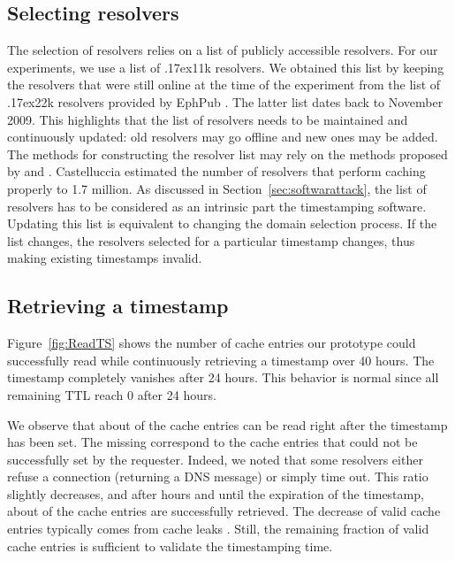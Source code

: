 \subsection{Selecting resolvers}
\label{sec:selectDNSres}
The selection of resolvers relies on a list of publicly accessible resolvers.
For our experiments, we use a list of {\raise.17ex\hbox{}}11k resolvers.
We obtained this list by keeping the resolvers that were still online at the time of the experiment from the list of {\raise.17ex\hbox{}}22k resolvers provided by EphPub \cite{Castelluccia2011}.
The latter list dates back to November 2009.
This highlights that the list of resolvers needs to be maintained and continuously updated: old resolvers may go offline and new ones may be added.
The methods for constructing the resolver list may rely on the methods proposed by \cite{Dagon2008} and \cite{Castelluccia2011}. Castelluccia \etal \cite{Castelluccia2011} estimated the number of resolvers that perform caching properly to 1.7 million.
As discussed in Section~\ref{sec:softwarattack}, the list of resolvers has to be considered as an intrinsic part the timestamping software. Updating this list is equivalent to changing the domain selection process. If the list changes, the resolvers selected for a particular timestamp changes, thus making existing timestamps invalid.

\subsection{Retrieving a timestamp}
Figure~\ref{fig:ReadTS} shows the number of cache entries our prototype could successfully read while continuously retrieving a timestamp over 40 hours. The timestamp completely vanishes after 24 hours. This behavior is normal since all remaining TTL reach 0 after 24 hours.

We observe that about  of the cache entries can be read right after the timestamp has been set. The missing  correspond to the cache entries that could not be successfully set by the requester. Indeed, we noted that some resolvers either refuse a connection (returning a DNS  message) or simply time out. This ratio slightly decreases, and after  hours and until the expiration of the timestamp, about  of the cache entries are successfully retrieved. The decrease of valid cache entries typically comes from cache leaks \cite{Kumar1993}. Still, the remaining fraction of valid cache entries is sufficient to validate the timestamping time.




